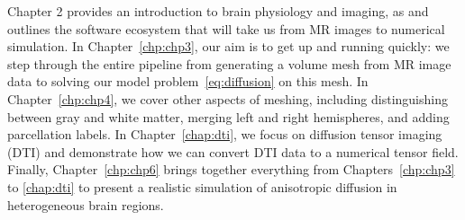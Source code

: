 Chapter 2 provides an introduction to brain physiology and imaging, as
and outlines the software ecosystem that will take us from MR images
to numerical simulation. In Chapter~\ref{chp:chp3}, our aim is to get
up and running quickly: we step through the entire pipeline from
generating a volume mesh from MR image data to solving our model
problem~\eqref{eq:diffusion} on this mesh. In Chapter~\ref{chp:chp4},
we cover other aspects of meshing, including distinguishing between
gray and white matter, merging left and right hemispheres, and adding
parcellation labels. In Chapter~\ref{chap:dti}, we focus on diffusion
tensor imaging (DTI) and demonstrate how we can convert DTI data to a
numerical tensor field. Finally, Chapter~\ref{chp:chp6} brings
together everything from Chapters~\ref{chp:chp3} to \ref{chap:dti} to
present a realistic simulation of anisotropic diffusion in
heterogeneous brain regions.
 
